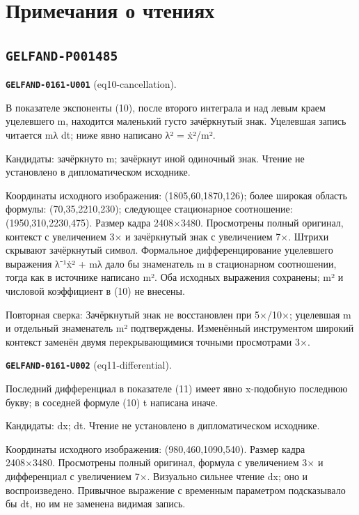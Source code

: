 \section*{Примечания о чтениях}
\subsection*{\texttt{GELFAND-P001485}}
\par\noindent\leavevmode{}\label{GELFAND-0161-U001}\label{GELFAND-P001485:eq10-cancellation}\textbf{\texttt{GELFAND-0161-U001}} (eq10-cancellation).\nopagebreak[4]\par
В показателе экспоненты (10), после второго интеграла и над левым краем уцелевшего m, находится маленький густо зачёркнутый знак. Уцелевшая запись читается mλ dt; ниже явно написано λ² = ẋ²/m².\par
Кандидаты: зачёркнуто m; зачёркнут иной одиночный знак. Чтение не установлено в дипломатическом исходнике.\par
Координаты исходного изображения: (1805,60,1870,126); более широкая область формулы: (70,35,2210,230); следующее стационарное соотношение: (1950,310,2230,475). Размер кадра 2408×3480. Просмотрены полный оригинал, контекст с увеличением 3× и зачёркнутый знак с увеличением 7×. Штрихи скрывают зачёркнутый символ. Формальное дифференцирование уцелевшего выражения λ⁻¹ẋ² + mλ дало бы знаменатель m в стационарном соотношении, тогда как в источнике написано m². Оба исходных выражения сохранены; m² и числовой коэффициент в (10) не внесены.\par
Повторная сверка: Зачёркнутый знак не восстановлен при 5×/10×; уцелевшая m и отдельный знаменатель m² подтверждены. Изменённый инструментом широкий контекст заменён двумя перекрывающимися точными просмотрами 3×.\par\medskip
\par\noindent\leavevmode{}\label{GELFAND-0161-U002}\label{GELFAND-P001485:eq11-differential}\textbf{\texttt{GELFAND-0161-U002}} (eq11-differential).\nopagebreak[4]\par
Последний дифференциал в показателе (11) имеет явно x-подобную последнюю букву; в соседней формуле (10) t написана иначе.\par
Кандидаты: dx; dt. Чтение не установлено в дипломатическом исходнике.\par
Координаты исходного изображения: (980,460,1090,540). Размер кадра 2408×3480. Просмотрены полный оригинал, формула с увеличением 3× и дифференциал с увеличением 7×. Визуально сильнее чтение dx; оно и воспроизведено. Привычное выражение с временным параметром подсказывало бы dt, но им не заменена видимая запись.\par
